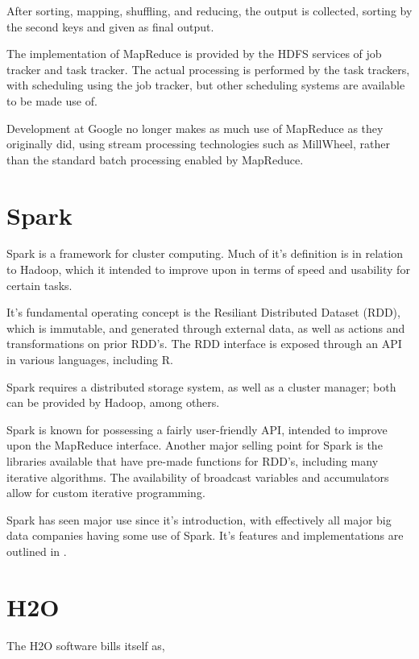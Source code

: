 \documentclass[10pt,a4paper]{article}
\begin{document}
After sorting, mapping, shuffling, and reducing, the output is
collected, sorting by the second keys and given as final output.

The implementation of MapReduce is provided by the HDFS services of
job tracker and task tracker. The actual processing is performed by
the task trackers, with scheduling using the job tracker, but other
scheduling systems are available to be made use of.

Development at Google no longer makes as much use of MapReduce as they
originally did, using stream processing technologies such as
MillWheel, rather than the standard batch processing enabled by
MapReduce\cite{akidau2013millwheel}.

\section{Spark}
\label{sec:spark}

Spark is a framework for cluster computing\cite{zaharia2010spark}. Much of it's definition is
in relation to Hadoop, which it intended to improve upon in terms of
speed and usability for certain tasks.

It's fundamental operating concept is the Resiliant Distributed
Dataset (RDD), which is immutable, and generated through external
data, as well as actions and transformations on prior RDD's. The RDD
interface is exposed through an API in various languages, including R.

Spark requires a distributed storage system, as well as a cluster
manager; both can be provided by Hadoop, among others.

Spark is known for possessing a fairly user-friendly API, intended to
improve upon the MapReduce interface. Another major selling point for
Spark is the libraries available that have pre-made functions for
RDD's, including many iterative algorithms. The availability of
broadcast variables and accumulators allow for custom iterative
programming.

Spark has seen major use since it's introduction, with effectively all
major big data companies having some use of Spark. It's features and
implementations are outlined in \textcite{zaharia2016apache}.

\section{H2O}
\label{sec:h2o}

The H2O software bills itself as,
\end{document}
